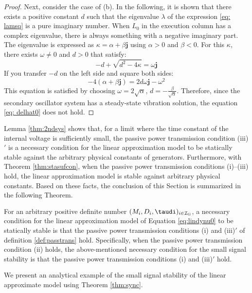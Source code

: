 \documentclass[graybox, envcountchap]{svmult}
\begin{document}
\begin{proof}
Next, consider the case of (b).
In the following, it is shown that there exists a positive constant $ d $ such that the eigenvalue $ \lambda $ of the expression \ref{eq: lamsq} is a pure imaginary number.
When $ L_0 $ in the execution column has a complex eigenvalue, there is always something with a negative imaginary part.
The eigenvalue is expressed as $ \kappa = \alpha + \beta \bm {j} $ using $ \alpha> 0 $ and $ \beta <0 $.
For this $ \kappa $, there exists $ \omega \neq 0 $ and $ d> 0 $ that satisfy: 
\[
-d + \sqrt{d^2-4\kappa}  = \omega \bm{j}
\]
If you transfer $ -d $ on the left side and square both sides:
\[
-4 (\alpha + \beta \bm{j}) = 2d \omega \bm{j} -\omega^2
\]
This equation is satisfied by choosing $ \omega = 2 \sqrt {\alpha} $, $ d =-\tfrac {\beta} {\sqrt {\alpha}} $.
Therefore, since the secondary oscillator system has a steady-state vibration solution, the equation \ref{eq: delhat0} does not hold.
\end{proof}


Lemma \ref{thm:2ndsys} shows that, for a limit where the time constant of the internal voltage is sufficiently small, the passive power transmission condition (iii)$'$ is a necessary condition for the linear approximation model to be statically stable against the arbitrary physical constants of generators.
Furthermore, with Theorem \ref{thm:stasufcon}, when the passive power transmission conditions (i)--(iii) hold, the linear approximation model is stable against arbitrary physical constants.
Based on these facts, the conclusion of this Section is summarized in the following Theorem.


\begin{theorem}\label{thm:sync}
For an arbitrary positive definite number $(M_i,D_i,\taudi)_{i \in \mathcal{I}_{\rm G}}$, a necessary condition for the linear approximation model of Equation \ref{eq:lindynu0} to be statically stable is that the passive power transmission conditions (i) and (iii)$'$ of definition \ref{def:passtrans} hold.
Specifically, when the passive power transmission condition (ii) holds, the above-mentioned necessary condition for the small signal stability is that the passive power transmission conditions (i) and (iii)$'$ hold.
\end{theorem}

We present an analytical example of the small signal stability of the linear approximate model using Theorem \ref{thm:sync}.
\end{document}

